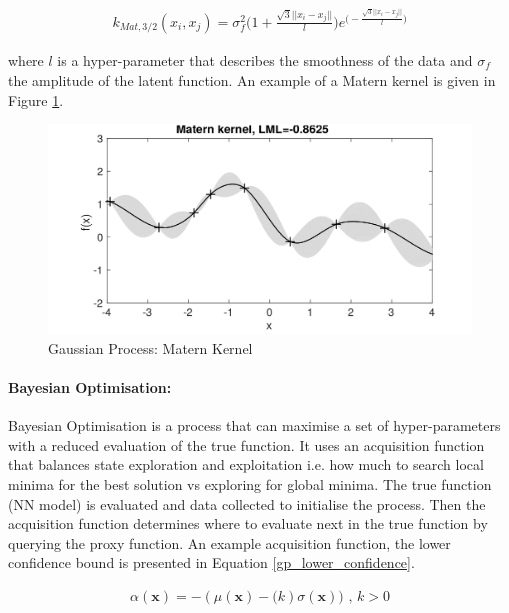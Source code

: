 \documentclass[11pt,twoside]{report}
\begin{document}
\begin{equation}
\begin{aligned}
k_{Mat,3/2}(x_{i},x_{j}) = 
\sigma_{f}^{2} \bigg ( 1 + 
\frac{\sqrt{3}||x_{i}-x_{j}||}{\mathit{l}} \bigg )e^{ \big (-\frac{\sqrt{3}||x_{i}-x_{j}||}{\mathit{l}} \big )}
\end{aligned}
\label{matern}
\end{equation}

where $\mathit{l}$ is a hyper-parameter that describes the smoothness of the data and $\mathit{\sigma_{f}}$ the amplitude of the latent function. An example of a Matern kernel is given in Figure \ref{matern_kernel_fig}.


\noindent \begin{figure}[h!]
	\includegraphics[width = 1.0\hsize]{./figures/Matern_Kernel.png}
	\caption{Gaussian Process: Matern Kernel \cite{Marc_Deisenroth_Notes}}
	\label{matern_kernel_fig}
\end{figure}

\paragraph{Bayesian Optimisation:}
Bayesian Optimisation is a process that can maximise a set of hyper-parameters with a reduced evaluation of the true function. It uses an acquisition function that balances state exploration and exploitation i.e. how much to search local minima for the best solution vs exploring for global minima. The true function (NN model) is evaluated and data collected to initialise the process. Then the acquisition function determines where to evaluate next in the true function by querying the proxy function. An example acquisition function, the lower confidence bound \cite{SrinivasNiranjan2010GPOi} is presented in Equation \ref{gp_lower_confidence}.

\begin{equation}
\begin{aligned}
\alpha(\mathbf{x}) = -(\mu(\mathbf{x}) - \mathit(k) \sigma (\mathbf{x})) \text{ , } k>0
\end{aligned}
\label{gp_lower_confidence}
\end{equation}
\end{document}
